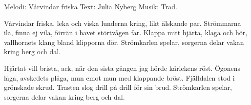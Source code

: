 \begin{song}


\begin{songmeta}
Melodi: Vårvindar friska
Text: Julia Nyberg
Musik: Trad.
\end{songmeta}

\begin{songtext}
Vårvindar friska, leka och viska
lunderna kring, likt älskande par.
Strömmarna ila, finna ej vila,
förrän i havet störtvågen far.
Klappa mitt hjärta, klaga och hör,
vallhornets klang bland klipporna dör.
Strömkarlen spelar, sorgerna delar
vakan kring berg och dal.

Hjärtat vill brista, ack, när den sista
gången jag hörde kärlekens röst.
Ögonens låga, avskedets plåga,
mun emot mun med klappande bröst.
Fjälldalen stod i grönskade skrud.
Trasten slog drill på drill för sin brud.
Strömkarlen spelar, sorgerna delar
vakan kring berg och dal.
\end{songtext}

\end{song}
